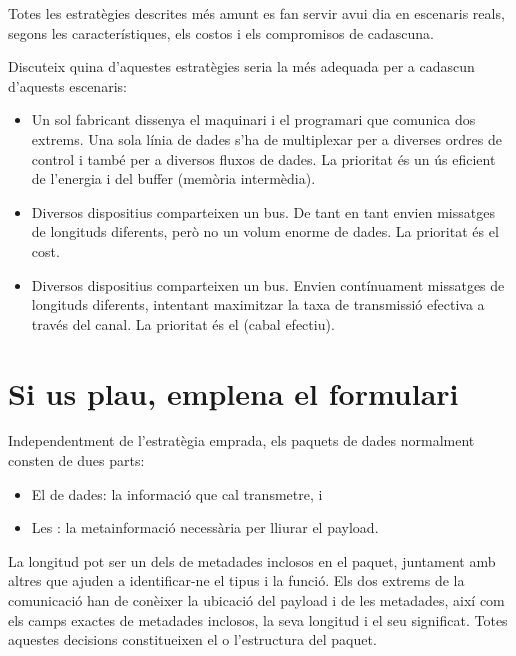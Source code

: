 \begin{exercise}
Totes les estratègies descrites més amunt es fan servir avui dia en escenaris reals, segons les 
característiques, els costos i els compromisos de cadascuna.

Discuteix quina d'aquestes estratègies seria la més adequada per a cadascun d'aquests escenaris:
\begin{itemize}
\item Un sol fabricant dissenya el maquinari i el programari que comunica dos extrems.
Una sola línia de dades s'ha de multiplexar per a diverses ordres de control
i també per a diversos fluxos de dades. La prioritat és un ús eficient de l'energia i del buffer (memòria intermèdia).

\item Diversos dispositius comparteixen un bus. De tant en tant envien missatges de longituds diferents,
però no un volum enorme de dades. La prioritat és el cost.

\item Diversos dispositius comparteixen un bus. Envien contínuament missatges de longituds diferents,
intentant maximitzar la taxa de transmissió efectiva a través del canal. 
La prioritat és el  (cabal efectiu).
\end{itemize}
\end{exercise}

\section{Si us plau, emplena el formulari}\label{sec:packets:format}

Independentment de l'estratègia emprada, els paquets de dades normalment consten de dues parts: 
\begin{itemize}
 \item El  de dades: la informació que cal transmetre, i
 \item Les : la metainformació necessària per lliurar el payload.
\end{itemize}
La longitud pot ser un dels  de metadades inclosos en el paquet, juntament amb 
altres que ajuden a identificar-ne el tipus i la funció.
% 
Els dos extrems de la comunicació han de conèixer la ubicació del payload i de les metadades, així com els camps exactes de metadades inclosos, la seva longitud i el seu significat.
Totes aquestes decisions constitueixen el 
o l'estructura del paquet.

